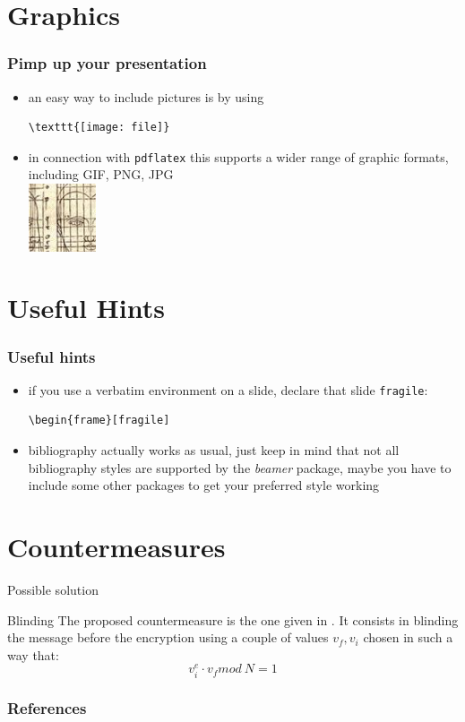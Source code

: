 \documentclass{beamer}
\begin{document}
\section{Graphics}

\begin{frame}[fragile]
\frametitle{Pimp up your presentation}
\begin{itemize}
\item an easy way to include pictures is by using
\begin{verbatim}
\texttt{[image: file]}
\end{verbatim}
\item in connection with {\tt pdflatex} this supports a wider range of graphic formats, including GIF, PNG, JPG \\[0.3cm]
\includegraphics[width=2cm,height=2cm]{./graphics/FF4.jpg}
\end{itemize}
\end{frame}

\section{Useful Hints}

\begin{frame}[fragile]
\frametitle{Useful hints}
\begin{itemize}
\item if you use a verbatim environment on a slide, declare that slide {\tt fragile}:
\begin{verbatim}
\begin{frame}[fragile]
\end{verbatim}
\item bibliography actually works as usual, just keep in mind that not all bibliography styles are supported by the {\it beamer}
      package, maybe you have to include some other packages to get your preferred style working  
\end{itemize}
\end{frame}

\nocite{*}

\section{Countermeasures}
\begin{frame}{Possible solution}
    \begin{block}{Blinding}
		The proposed countermeasure is the one given in \cite{kocher1996timing}.
		It consists in blinding the message before the encryption using a couple of values $v_f, v_i$ chosen in such a way that:
		\begin{equation*}
			v_i^e \cdot v_f mod\: N = 1
		\end{equation*}
    \end{block}
\end{frame}

\begin{frame}[allowframebreaks]
	\frametitle{References}
	\footnotesize
	
	
\end{frame} 
\end{document}
